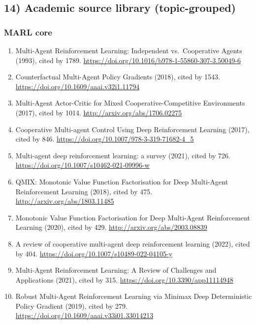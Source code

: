 \documentclass[
]{article}
\providecommand{\tightlist}{%
  \setlength{\itemsep}{0pt}\setlength{\parskip}{0pt}}
\begin{document}
\hypertarget{academic-source-library-topic-grouped}{%
\subsection{14) Academic source library
(topic-grouped)}\label{academic-source-library-topic-grouped}}

\hypertarget{marl-core}{%
\subsubsection{MARL core}\label{marl-core}}

\begin{enumerate}
\def\labelenumi{\arabic{enumi}.}
\tightlist
\item
  Multi-Agent Reinforcement Learning: Independent vs.~Cooperative Agents
  (1993), cited by 1789.
  \url{https://doi.org/10.1016/b978-1-55860-307-3.50049-6}
\item
  Counterfactual Multi-Agent Policy Gradients (2018), cited by 1543.
  \url{https://doi.org/10.1609/aaai.v32i1.11794}
\item
  Multi-Agent Actor-Critic for Mixed Cooperative-Competitive
  Environments (2017), cited by 1014.
  \url{http://arxiv.org/abs/1706.02275}
\item
  Cooperative Multi-agent Control Using Deep Reinforcement Learning
  (2017), cited by 846.
  \url{https://doi.org/10.1007/978-3-319-71682-4_5}
\item
  Multi-agent deep reinforcement learning: a survey (2021), cited by
  726. \url{https://doi.org/10.1007/s10462-021-09996-w}
\item
  QMIX: Monotonic Value Function Factorisation for Deep Multi-Agent
  Reinforcement Learning (2018), cited by 475.
  \url{http://arxiv.org/abs/1803.11485}
\item
  Monotonic Value Function Factorisation for Deep Multi-Agent
  Reinforcement Learning (2020), cited by 429.
  \url{http://arxiv.org/abs/2003.08839}
\item
  A review of cooperative multi-agent deep reinforcement learning
  (2022), cited by 404. \url{https://doi.org/10.1007/s10489-022-04105-y}
\item
  Multi-Agent Reinforcement Learning: A Review of Challenges and
  Applications (2021), cited by 315.
  \url{https://doi.org/10.3390/app11114948}
\item
  Robust Multi-Agent Reinforcement Learning via Minimax Deep
  Deterministic Policy Gradient (2019), cited by 279.
  \url{https://doi.org/10.1609/aaai.v33i01.33014213}

\end{enumerate}
\end{document}
